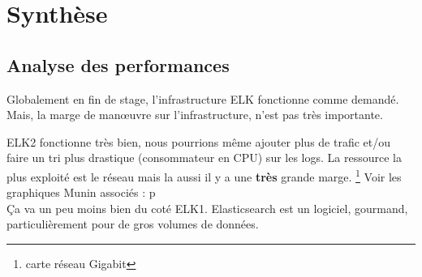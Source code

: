 %
%
%
%
\chapter{Synthèse}
\section{Analyse des performances}
Globalement en fin de stage, l'infrastructure ELK fonctionne comme demandé.
Mais, la marge de manœuvre sur l'infrastructure, n'est pas très importante.

ELK2 fonctionne très bien, nous pourrions même ajouter plus de trafic et/ou faire
un tri plus drastique (consommateur en CPU) sur les logs. 
La ressource la plus exploité est le réseau mais la aussi il y a une \textbf{très} grande marge.
\footnote{carte réseau Gigabit}
Voir les graphiques \gls{Munin} associés :  p\pageref{fig:elk2cpu} \\[3mm]


Ça va un peu moins bien du coté ELK1. Elasticsearch est un logiciel, gourmand, particulièrement
pour de gros volumes de données. 

